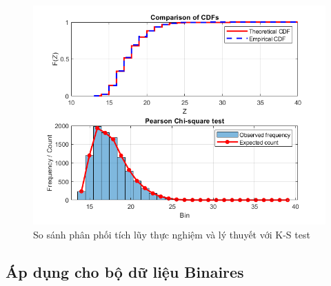 \begin{figure}[h!]
    \centering
    \includegraphics[width=\textwidth]{../../assets/images/KS_fig_Singletons.png}
    \caption{So sánh phân phối tích lũy thực nghiệm và lý thuyết với K-S test}
    \label{fig:Sing_comparisonKS}
\end{figure}

\subsection{Áp dụng cho bộ dữ liệu Binaires}

